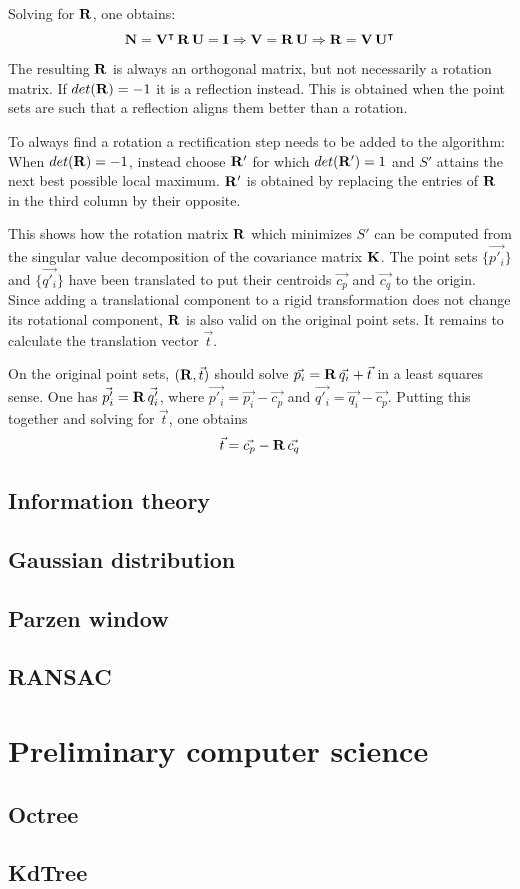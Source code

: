 Solving for $\mathbf{R}$, one obtains:
\begin{equation}
\mathbf{N} = \mathbf{V}^\intercal \, \mathbf{R} \, \mathbf{U} = \mathbf{I}
\Rightarrow \mathbf{V} = \mathbf{R} \, \mathbf{U}
\Rightarrow \mathbf{R} = \mathbf{V} \, \mathbf{U}^\intercal
\end{equation}
The resulting $\mathbf{R}$ is always an orthogonal matrix, but not necessarily a rotation matrix. If $det(\mathbf{R}) = -1$ it is a reflection instead. This is obtained when the point sets are such that a reflection aligns them better than a rotation.

To always find a rotation a rectification step needs to be added to the algorithm: When $det(\mathbf{R}) = -1$, instead choose $\mathbf{R'}$ for which $det(\mathbf{R'}) = 1$ and $S'$ attains the next best possible local maximum. $\mathbf{R'}$ is obtained by replacing the entries of $\mathbf{R}$ in the third column by their opposite.

This shows how the rotation matrix $\mathbf{R}$ which minimizes $S'$ can be computed from the singular value decomposition of the covariance matrix $\mathbf{K}$. The point sets $\{ \vec{p'_i} \}$ and $\{ \vec{q'_i} \}$ have been translated to put their centroids $\vec{c_p}$ and $\vec{c_q}$ to the origin. Since adding a translational component to a rigid transformation does not change its rotational component, $\mathbf{R}$ is also valid on the original point sets. It remains to calculate the translation vector $\vec{t}$.

On the original point sets, $(\mathbf{R}, \vec{t})$ should solve $\vec{p_i} = \mathbf{R} \, \vec{q_i} + \vec{t}$ in a least squares sense. One has $\vec{p'_i} = \mathbf{R} \, \vec{q'_i}$, where $\vec{p'_i} = \vec{p_i} - \vec{c_p}$ and $\vec{q'_i} = \vec{q_i} - \vec{c_p}$. Putting this together and solving for $\vec{t}$, one obtains
\begin{equation}
\vec{t} = \vec{c_p} - \mathbf{R} \, \vec{c_q}
\end{equation}


\subsection{Information theory}

\subsection{Gaussian distribution}

\subsection{Parzen window}

\subsection{RANSAC}

\section{Preliminary computer science}

\subsection{Octree}

\subsection{KdTree}
